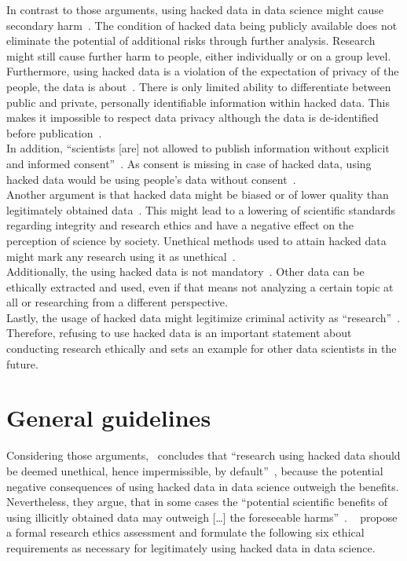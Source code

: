 In contrast to those arguments, using hacked data in data science might cause secondary harm~\parencites[][746]{nature}[23]{acm}.
The condition of hacked data being publicly available does not eliminate the potential of additional risks through further analysis.
Research might still cause further harm to people, either individually or on a group level.\\
Furthermore, using hacked data is a violation of the expectation of privacy of the people, the data is about~\parencite[][5]{patreon}.
There is only limited ability to differentiate between public and private, personally identifiable information within hacked data.
This makes it impossible to respect data privacy although the data is de-identified before publication~\parencite[][746]{nature}.\\
In addition, ``scientists [are] not allowed to publish information without explicit and informed consent''~\parencite[][745]{nature}.
As consent is missing in case of hacked data, using hacked data would be using people's data without consent~\parencite[][5]{patreon}.\\
Another argument is that hacked data might be biased or of lower quality than legitimately obtained data~\parencite[][746]{nature}.
This might lead to a lowering of scientific standards regarding integrity and research ethics and have a negative effect on the perception of science by society.
Unethical methods used to attain hacked data might mark any research using it as unethical~\parencite[][24]{acm}.\\
Additionally, the using hacked data is not mandatory~\parencite[][5]{patreon}.
Other data can be ethically extracted and used, even if that means not analyzing a certain topic at all or researching from a different perspective.\\
Lastly, the usage of hacked data might legitimize criminal activity as ``research''~\parencites[][5]{patreon}[][24]{acm}.
Therefore, refusing to use hacked data is an important statement about conducting research ethically and sets an example for other data scientists in the future.

\section*{General guidelines}

Considering those arguments,~\textcite{nature} concludes that ``research using hacked data should be deemed unethical, hence impermissible, by default''~\parencite[][747]{nature}, because the potential negative consequences of using hacked data in data science outweigh the benefits.
Nevertheless, they argue, that in some cases the ``potential scientific benefits of using illicitly obtained data may outweigh [\ldots] the foreseeable harms''~\parencite[][747]{nature}.
~\textcite[747-748]{nature} propose a formal research ethics assessment and formulate the following six ethical requirements as necessary for legitimately using hacked data in data science.


